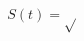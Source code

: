 \documentclass[preview]{standalone}
\begin{document}
\begin{align*}
S(t) = \sqrt{}
\end{align*}
\end{document}

